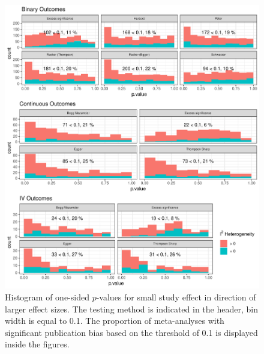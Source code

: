 \documentclass[11pt,a4paper,twoside]{book}\usepackage[]{graphicx}\usepackage[]{color}
\newenvironment{knitrout}{}{} %
\begin{document}
\begin{figure}
\begin{knitrout}
\color{fgcolor}

{\centering \includegraphics[width=\textwidth-3cm]{figure/ch03_figunnamed-chunk-14-1} 

}



\end{knitrout}
\caption{Histogram of one-sided $p$-values for small study effect in direction of larger effect sizes. The testing method is indicated in the header, bin width is equal to 0.1. The proportion of meta-analyses with significant publication bias based on the threshold of 0.1 is displayed inside the figures.}
\label{fig:test}
\end{figure}
\end{document}
